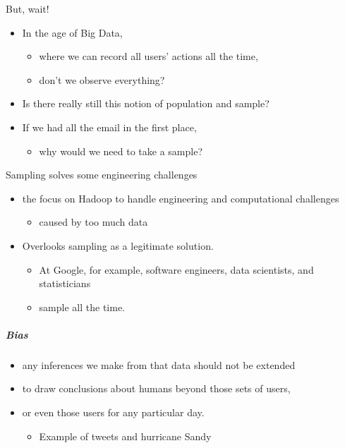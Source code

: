 \documentclass[]{article}
\providecommand{\tightlist}{%
  \setlength{\itemsep}{0pt}\setlength{\parskip}{0pt}}
\let\oldsubparagraph\subparagraph
\renewcommand{\subparagraph}[1]{\oldsubparagraph{#1}\mbox{}}
\begin{document}
But, wait!

\begin{itemize}
\tightlist
\item
  In the age of Big Data,

  \begin{itemize}
  \tightlist
  \item
    where we can record all users' actions all the time,
  \item
    don't we observe everything?
  \end{itemize}
\item
  Is there really still this notion of population and sample?
\item
  If we had all the email in the first place,

  \begin{itemize}
  \tightlist
  \item
    why would we need to take a sample?
  \end{itemize}
\end{itemize}

Sampling solves some engineering challenges

\begin{itemize}
\tightlist
\item
  the focus on Hadoop to handle engineering and computational challenges

  \begin{itemize}
  \tightlist
  \item
    caused by too much data
  \end{itemize}
\item
  Overlooks sampling as a legitimate solution.

  \begin{itemize}
  \tightlist
  \item
    At Google, for example, software engineers, data scientists, and
    statisticians
  \item
    sample all the time.
  \end{itemize}
\end{itemize}

\subparagraph{Bias}\label{bias}

\begin{itemize}
\tightlist
\item
  any inferences we make from that data should not be extended
\item
  to draw conclusions about humans beyond those sets of users,
\item
  or even those users for any particular day.

  \begin{itemize}
  \tightlist
  \item
    Example of tweets and hurricane Sandy
  \end{itemize}
\end{itemize}
\end{document}
